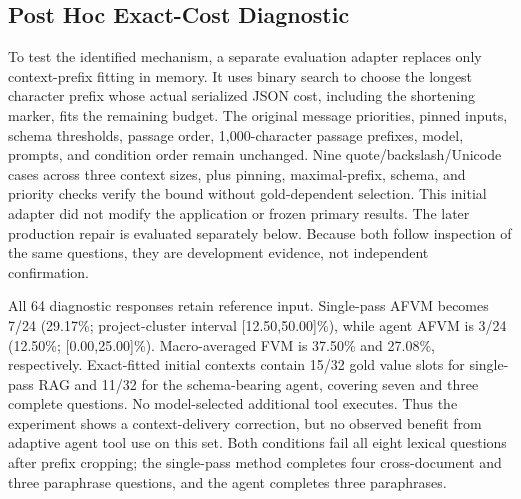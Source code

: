 \documentclass[conference,letterpaper]{IEEEtran}
\begin{document}
\subsection{Post Hoc Exact-Cost Diagnostic}
To test the identified mechanism, a separate evaluation adapter replaces only context-prefix fitting in memory. It uses binary search to choose the longest character prefix whose actual serialized JSON cost, including the shortening marker, fits the remaining budget. The original message priorities, pinned inputs, schema thresholds, passage order, 1,000-character passage prefixes, model, prompts, and condition order remain unchanged. Nine quote/backslash/Unicode cases across three context sizes, plus pinning, maximal-prefix, schema, and priority checks verify the bound without gold-dependent selection. This initial adapter did not modify the application or frozen primary results. The later production repair is evaluated separately below. Because both follow inspection of the same questions, they are development evidence, not independent confirmation.

All 64 diagnostic responses retain reference input. Single-pass AFVM becomes 7/24 (29.17\%; project-cluster interval [12.50,50.00]\%), while agent AFVM is 3/24 (12.50\%; [0.00,25.00]\%). Macro-averaged FVM is 37.50\% and 27.08\%, respectively. Exact-fitted initial contexts contain 15/32 gold value slots for single-pass RAG and 11/32 for the schema-bearing agent, covering seven and three complete questions. No model-selected additional tool executes. Thus the experiment shows a context-delivery correction, but no observed benefit from adaptive agent tool use on this set. Both conditions fail all eight lexical questions after prefix cropping; the single-pass method completes four cross-document and three paraphrase questions, and the agent completes three paraphrases.
\end{document}
